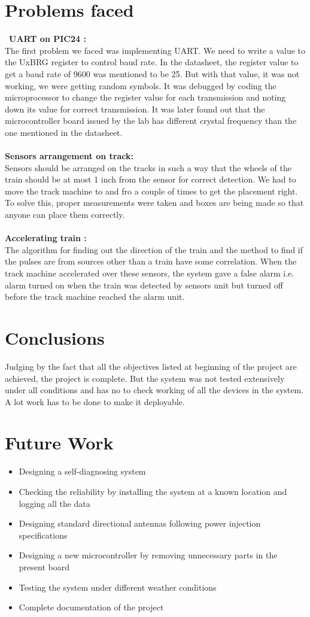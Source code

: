 \documentclass[aps,letterpaper,11pt]{article}
\begin{document}
\section{Problems faced}\
\textbf{UART on PIC24 :} \\
The first problem we faced was implementing UART. We need to write a value to the
UxBRG register to control baud rate. In the datasheet, the register value to get a baud rate of 9600 was
mentioned to be 25. But with that value, it was not working, we were getting random symbols. It was
debugged by coding the microprocessor to change the register value for each transmission and noting
down its value for correct transmission. It was later found out that the microcontroller board issued by the
lab has different crystal frequency than the one mentioned in the datasheet.
\\ \\
\textbf{Sensors arrangement on track:} \\
Sensors should be arranged on the tracks in such a way that the wheels of the train
should be at most 1 inch from the sensor for correct detection. We had to move the track machine to and
fro a couple of times to get the placement right. To solve this, proper measurements were taken and boxes
are being made so that anyone can place them correctly.
\\ \\
\textbf{Accelerating train :}
\\
The algorithm for finding out the direction of the train and the method to find if the
pulses are from sources other than a train have some correlation. When the track machine accelerated
over these sensors, the system gave a false alarm i.e. alarm turned on when the train was detected by
sensors unit but turned off before the track machine reached the alarm unit.
\section{Conclusions}
Judging by the fact that all the objectives listed at beginning of the project are achieved, the project is
complete. But the system was not tested extensively under all conditions and has no to check
working of all the devices in the system. A lot work has to be done to make it deployable.
\section{Future Work}
\begin{itemize}
  \item Designing a self-diagnosing system
  \item Checking the reliability by installing the system at a known location and logging all the data
  \item Designing standard directional antennas following power injection specifications
  \item Designing a new microcontroller by removing unnecessary parts in the present board
  \item Testing the system under different weather conditions
  \item Complete documentation of the project
\end{itemize}
\end{document}

